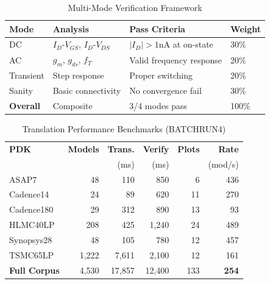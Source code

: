 \documentclass[10pt,twocolumn]{article}
\begin{document}
\begin{table}[!t]
\caption{Multi-Mode Verification Framework}
\label{tab:verify_modes_appendix}
\centering
\renewcommand{\arraystretch}{1.15}
\begin{tabular}{@{}llll@{}}
\toprule
\textbf{Mode} & \textbf{Analysis} & \textbf{Pass Criteria} & \textbf{Weight} \\
\midrule
DC & $I_D$-$V_{GS}$, $I_D$-$V_{DS}$ & $|I_D| > 1$nA at on-state & 30\% \\
AC & $g_m$, $g_{ds}$, $f_T$ & Valid frequency response & 20\% \\
Transient & Step response & Proper switching & 20\% \\
Sanity & Basic connectivity & No convergence fail & 30\% \\
\midrule
\textbf{Overall} & Composite & 3/4 modes pass & 100\% \\
\bottomrule
\end{tabular}
\end{table}

\begin{table}[!t]
\caption{Translation Performance Benchmarks (BATCHRUN4)}
\label{tab:performance_appendix}
\centering
\renewcommand{\arraystretch}{1.15}
\begin{tabular}{@{}lrrrrr@{}}
\toprule
\textbf{PDK} & \textbf{Models} & \textbf{Trans.} & \textbf{Verify} & \textbf{Plots} & \textbf{Rate} \\
 & & (ms) & (ms) & & (mod/s) \\
\midrule
ASAP7 & 48 & 110 & 850 & 6 & 436 \\
Cadence14 & 24 & 89 & 620 & 11 & 270 \\
Cadence180 & 29 & 312 & 890 & 13 & 93 \\
HLMC40LP & 208 & 425 & 1,240 & 24 & 489 \\
Synopsys28 & 48 & 105 & 780 & 12 & 457 \\
TSMC65LP & 1,222 & 7,611 & 2,100 & 12 & 161 \\
\midrule
\textbf{Full Corpus} & 4,530 & 17,857 & 12,400 & 133 & \textbf{254} \\
\bottomrule
\end{tabular}
\end{table}
\end{document}
